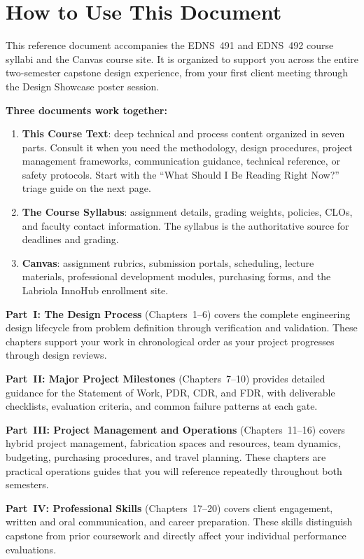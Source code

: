 \chapter*{How to Use This Document}

This reference document accompanies the EDNS~491 and EDNS~492 course syllabi and the Canvas course site. It is organized to support you across the entire two-semester capstone design experience, from your first client meeting through the Design Showcase poster session.

\textbf{Three documents work together:}
\begin{enumerate}[nosep,leftmargin=1.5em]
\item \textbf{This Course Text}: deep technical and process content organized in seven parts. Consult it when you need the methodology, design procedures, project management frameworks, communication guidance, technical reference, or safety protocols. Start with the ``What Should I Be Reading Right Now?'' triage guide on the next page.
\item \textbf{The Course Syllabus}: assignment details, grading weights, policies, CLOs, and faculty contact information. The syllabus is the authoritative source for deadlines and grading.
\item \textbf{Canvas}: assignment rubrics, submission portals, scheduling, lecture materials, professional development modules, purchasing forms, and the Labriola InnoHub enrollment site.
\end{enumerate}

\textbf{Part~I: The Design Process} (Chapters~1--6) covers the complete engineering design lifecycle from problem definition through verification and validation. These chapters support your work in chronological order as your project progresses through design reviews.

\textbf{Part~II: Major Project Milestones} (Chapters~7--10) provides detailed guidance for the Statement of Work, PDR, CDR, and FDR, with deliverable checklists, evaluation criteria, and common failure patterns at each gate.

\textbf{Part~III: Project Management and Operations} (Chapters~11--16) covers hybrid project management, fabrication spaces and resources, team dynamics, budgeting, purchasing procedures, and travel planning. These chapters are practical operations guides that you will reference repeatedly throughout both semesters.

\textbf{Part~IV: Professional Skills} (Chapters~17--20) covers client engagement, written and oral communication, and career preparation. These skills distinguish capstone from prior coursework and directly affect your individual performance evaluations.

